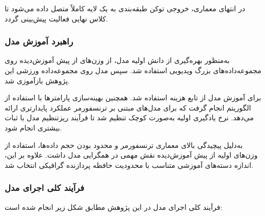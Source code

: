 \documentclass[12pt]{report}
\begin{document}
در انتهای معماری، خروجی توکن طبقه‌بندی به یک لایه کاملاً متصل داده می‌شود تا کلاس نهایی فعالیت پیش‌بینی گردد.

\subsubsection{راهبرد آموزش مدل}
به‌منظور بهره‌گیری از دانش اولیه مدل، از وزن‌های از پیش آموزش‌دیده روی مجموعه‌داده‌های بزرگ ویدیویی استفاده شد. سپس مدل روی مجموعه‌داده ورزشی این پژوهش بازآموزی شد.

برای آموزش مدل از تابع هزینه  استفاده شد. همچنین بهینه‌سازی پارامترها با استفاده از الگوریتم  انجام گرفت که برای مدل‌های مبتنی بر ترنسفورمر عملکرد پایدارتری ارائه می‌دهد. نرخ یادگیری اولیه به‌صورت کوچک تنظیم شد تا فرآیند ریزتنظیم مدل با ثبات بیشتری انجام شود.

به‌دلیل پیچیدگی بالای معماری ترنسفورمر و محدود بودن حجم داده‌ها، استفاده از وزن‌های اولیه از پیش آموزش‌دیده نقش مهمی در همگرایی مدل داشت. علاوه بر این، اندازه دسته‌های آموزشی متناسب با محدودیت حافظه پردازنده گرافیکی انتخاب شد.

\subsubsection{فرآیند کلی اجرای مدل}

فرآیند کلی اجرای مدل  در این پژوهش مطابق شکل زیر انجام شده است:

\begin{figure}[H] 
\centering 
{} 
\caption{} 
\end{figure}
\end{document}
